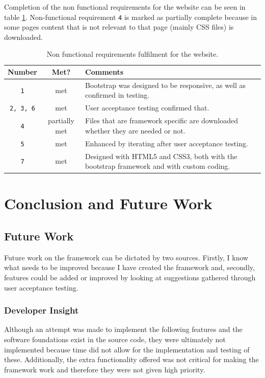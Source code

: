 \documentclass[12pt]{ecsproject}     %
\begin{document}
Completion of the non functional requirements for the website can be seen in table \ref{tab:wsrf}. Non-functional requirement \texttt{4} is marked as partially complete because in some pages content that is not relevant to that page (mainly CSS files) is downloaded.

\begin{table}
\begin{tabular}{ c | c | p{10cm}}
\textbf{Number} & \textbf{Met?} & \textbf{Comments} \\
\hline
\texttt{1} & met & Bootstrap was designed to be responsive, as well as confirmed in testing.\\
\texttt{2, 3, 6} & met & User acceptance testing confirmed that. \\
\texttt{4} & partially met & Files that are framework specific are downloaded whether they are needed or not.\\
\texttt{5} & met & Enhanced by iterating after user acceptance testing.\\
\texttt{7} & met & Designed with HTML5 and CSS3, both with the bootstrap framework and with custom coding.\\
\end{tabular}
\caption{Non functional requirements fulfilment for the website.}
\label{tab:wsrf}
\end{table}


\chapter{Conclusion and Future Work}
\label{chap:conc}
\section{Future Work}
Future work on the framework can be dictated by two sources. Firstly, I know what needs to be improved because I have created the framework and, secondly, features could be added or improved by looking at suggestions gathered through user acceptance testing.

\subsection{Developer Insight}
Although an attempt was made to implement the following features and the software foundations exist in the source code, they were ultimately not implemented because time did not allow for the implementation and testing of these. Additionally, the extra functionality offered was not critical for making the framework work and therefore they were not given high priority.
\end{document}
